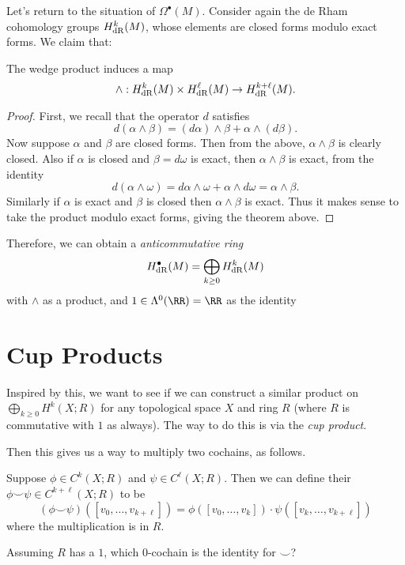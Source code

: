 Let's return to the situation of $\Omega^\bullet(M)$.
Consider again the de Rham cohomology groups $H_{\mathrm{dR}}^k(M)$,
whose elements are closed forms modulo exact forms.
We claim that:
\begin{lemma}
	The wedge product induces a map
	\[ \wedge : H_{\mathrm{dR}}^k(M) \times H_{\mathrm{dR}}^\ell(M) \to H_{\mathrm{dR}}^{k+\ell}(M). \]
\end{lemma}
\begin{proof}
	First, we recall that the operator $d$ satisfies
	\[
		d(\alpha \wedge \beta)
		= (d\alpha) \wedge \beta + \alpha \wedge (d\beta).
	\]
	Now suppose $\alpha$ and $\beta$ are closed forms.
	Then from the above, $\alpha \wedge \beta$ is clearly closed.
	Also if $\alpha$ is closed and $\beta = d\omega$ is exact,
	then $\alpha \wedge \beta$ is exact, from the identity
	\[ d(\alpha \wedge \omega)
		= d\alpha \wedge\omega + \alpha \wedge d\omega = \alpha \wedge \beta. \]
	Similarly if $\alpha$ is exact and $\beta$ is closed
	then $\alpha \wedge \beta$ is exact.
	Thus it makes sense to take the product modulo exact forms,
	giving the theorem above.
\end{proof}

Therefore, we can obtain a \emph{anticommutative ring}
\[ H_{\mathrm{dR}}^\bullet(M) = \bigoplus_{k \ge 0} H_{\mathrm{dR}}^k(M) \]
with $\wedge$ as a product, and $1 \in \Lambda^0(\RR) = \RR$ as the identity

\section{Cup Products}
Inspired by this, we want to see if we can construct a similar product
on $\bigoplus_{k \ge 0} H^k(X; R)$ for any topological space $X$ and ring $R$
(where $R$ is commutative with $1$ as always).
The way to do this is via the \emph{cup product}.

Then this gives us a way to multiply two cochains, as follows.
\begin{definition}
	Suppose $\phi \in C^k(X;R)$ and $\psi \in C^\ell(X;R)$.
	Then we can define their 
	$\phi\smile\psi \in C^{k+\ell}(X;R)$ to be
	\[
		(\phi\smile\psi)([v_0, \dots, v_{k+\ell}])
		= 
		\phi\left( [v_0, \dots, v_k] \right)
		\cdot
		\psi\left( [v_k, \dots, v_{k+\ell}] \right)
	\]
	where the multiplication is in $R$.
\end{definition}

\begin{ques}
	Assuming $R$ has a $1$, which $0$-cochain is the identity for $\smile$?
\end{ques}

